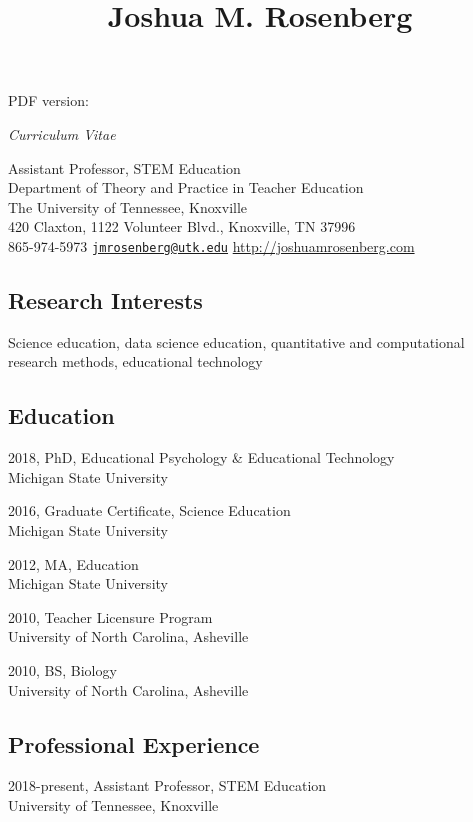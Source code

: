 \documentclass[14,]{article}
\title{Joshua M. Rosenberg}
\author{}
\date{}
\begin{document}
\maketitle

PDF version:

\emph{Curriculum Vitae}

Assistant Professor, STEM Education\\
Department of Theory and Practice in Teacher Education\\
The University of Tennessee, Knoxville\\
420 Claxton, 1122 Volunteer Blvd., Knoxville, TN 37996\\
865-974-5973 \textbar{}
\href{mailto:jmrosenberg@utk.edu}{\nolinkurl{jmrosenberg@utk.edu}}
\textbar{} \url{http://joshuamrosenberg.com}

\subsection{Research Interests}\label{research-interests}

Science education, data science education, quantitative and
computational research methods, educational technology

\subsection{Education}\label{education}

2018, PhD, Educational Psychology \& Educational Technology\\
Michigan State University

2016, Graduate Certificate, Science Education\\
Michigan State University

2012, MA, Education\\
Michigan State University

2010, Teacher Licensure Program\\
University of North Carolina, Asheville

2010, BS, Biology\\
University of North Carolina, Asheville

\subsection{Professional Experience}\label{professional-experience}

2018-present, Assistant Professor, STEM Education\\
University of Tennessee, Knoxville
\end{document}
